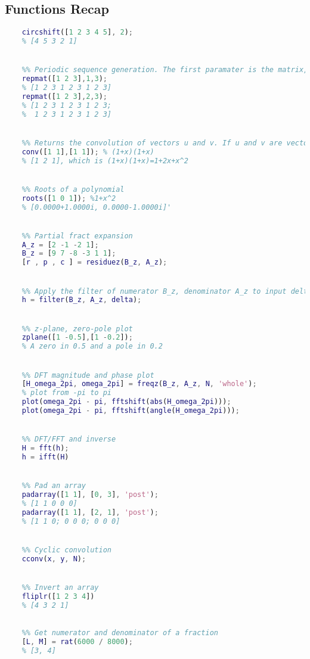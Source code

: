 \pagebreak\subsection{Functions Recap}
\begin{lstlisting}[language=Matlab, escapeinside=`']
    %% Shifting discrete signals, a positive value will shift to the right. Circular, if shifting right by n, first n values will become the last n values
    circshift([1 2 3 4 5], 2);
    % [4 5 3 2 1]


    %% Periodic sequence generation. The first paramater is the matrix, the second one is the rows repetition, the third is the cols repetition
    repmat([1 2 3],1,3);
    % [1 2 3 1 2 3 1 2 3]
    repmat([1 2 3],2,3);
    % [1 2 3 1 2 3 1 2 3;
    %  1 2 3 1 2 3 1 2 3] 


    %% Returns the convolution of vectors u and v. If u and v are vectors of polynomial coefficients, convolving them is equivalent to multiplying the two polynomials.
    conv([1 1],[1 1]); % (1+x)(1+x)
    % [1 2 1], which is (1+x)(1+x)=1+2x+x^2


    %% Roots of a polynomial
    roots([1 0 1]); %1+x^2
    % [0.0000+1.0000i, 0.0000-1.0000i]'


    %% Partial fract expansion
    A_z = [2 -1 -2 1];
    B_z = [9 7 -8 -3 1 1];
    [r , p , c ] = residuez(B_z, A_z);


    %% Apply the filter of numerator B_z, denominator A_z to input delta
    h = filter(B_z, A_z, delta);


    %% z-plane, zero-pole plot
    zplane([1 -0.5],[1 -0.2]);
    % A zero in 0.5 and a pole in 0.2


    %% DFT magnitude and phase plot
    [H_omega_2pi, omega_2pi] = freqz(B_z, A_z, N, 'whole');
    % plot from -pi to pi
    plot(omega_2pi - pi, fftshift(abs(H_omega_2pi)));
    plot(omega_2pi - pi, fftshift(angle(H_omega_2pi)));


    %% DFT/FFT and inverse
    H = fft(h);
    h = ifft(H)


    %% Pad an array
    padarray([1 1], [0, 3], 'post');
    % [1 1 0 0 0]
    padarray([1 1], [2, 1], 'post');
    % [1 1 0; 0 0 0; 0 0 0]


    %% Cyclic convolution
    cconv(x, y, N);


    %% Invert an array
    fliplr([1 2 3 4])
    % [4 3 2 1]

    
    %% Get numerator and denominator of a fraction
    [L, M] = rat(6000 / 8000); 
    % [3, 4]
\end{lstlisting}
